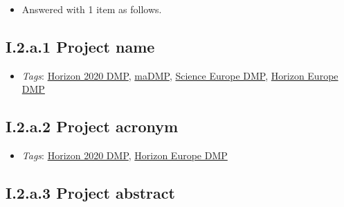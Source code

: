 \documentclass[a4paper,12pt]{report}
\begin{document}
\begin{itemize}
  \item[\ArrowBoldDownRight] Answered with 1 item as follows.
\end{itemize}%
\subsection*{\protect\textcolor{colorSecId}{I.2.a.1} Project name}

\label{1e85da40-bbfc-4180-903e-6c569ed2da38.c3dabaaf-c946-4a0d-889c-ede966f97667.a14632ce-345c-48fa-8757-db609735ca1e.f0ef08fd-d733-465c-bc66-5de0b826c41b}


\begin{itemize}
  \item \textit{Tags}: \ul{Horizon 2020 DMP}, \ul{maDMP}, \ul{Science Europe DMP}, \ul{Horizon Europe DMP}
  \end{itemize}





\subsection*{\protect\textcolor{colorSecId}{I.2.a.2} Project acronym}

\label{1e85da40-bbfc-4180-903e-6c569ed2da38.c3dabaaf-c946-4a0d-889c-ede966f97667.a14632ce-345c-48fa-8757-db609735ca1e.5b765df9-299f-4855-9e99-aa844903f8f6}


\begin{itemize}
  \item \textit{Tags}: \ul{Horizon 2020 DMP}, \ul{Horizon Europe DMP}
  \end{itemize}





\subsection*{\protect\textcolor{colorSecId}{I.2.a.3} Project abstract}
\end{document}
